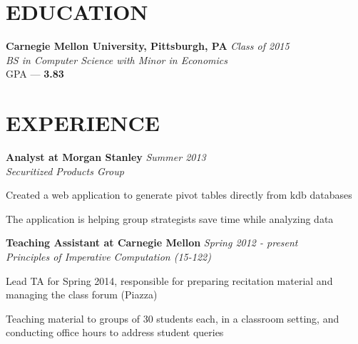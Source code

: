 \documentclass[margin, 11pt]{res} %
\begin{document}
\begin{resume}


\section{EDUCATION}

{\bf Carnegie Mellon University, Pittsburgh, PA} \hfill {\sl Class of 2015}\\
{\sl BS in Computer Science with Minor in Economics } \\
{\small GPA --- \textbf{3.83}}



\section{EXPERIENCE}

{\bf Analyst at Morgan Stanley} \hfill {\sl Summer 2013} \\
{\sl Securitized Products Group}
\begin{itemize} \itemsep -2pt %
{\small \item Created a web application to generate pivot tables directly from kdb databases
\item The application is helping group strategists save time while analyzing data}
\end{itemize}

\vspace{3pt}

{\bf Teaching Assistant at Carnegie Mellon} \hfill {\sl Spring 2012 - present}\\
{\sl Principles of Imperative Computation (15-122)}

\begin{itemize} \itemsep -2pt
{\small \item Lead TA for Spring 2014, responsible for preparing recitation material and managing the class forum (Piazza)
\item Teaching material to groups of 30 students each, in a classroom setting, and conducting office hours to address student queries}
\end{itemize}


\end{resume}
\end{document}
